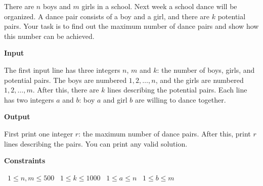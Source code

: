 There are $n$ boys and $m$ girls in a school. Next week a school dance will be organized. A dance pair consists of a boy and a girl, and there are $k$ potential pairs.
Your task is to find out the maximum number of dance pairs and show how this number can be achieved.

\vspace{0.3cm}\noindent\textbf{Input}

The first input line has three integers $n$, $m$ and $k$: the number of boys, girls, and potential pairs. The boys are numbered $1,2,\dots,n$, and the girls are numbered $1,2,\dots,m$.
After this, there are $k$ lines describing the potential pairs. Each line has two integers $a$ and $b$: boy $a$ and girl $b$ are willing to dance together.

\vspace{0.3cm}\noindent\textbf{Output}

First print one integer $r$: the maximum number of dance pairs. After this, print $r$ lines describing the pairs. You can print any valid solution.

\vspace{0.3cm}\noindent\textbf{Constraints}

\textbullet\ $1 \le n,m \le 500$
\textbullet\ $1 \le k \le 1000$
\textbullet\ $1 \le a \le n$
\textbullet\ $1 \le b \le m$